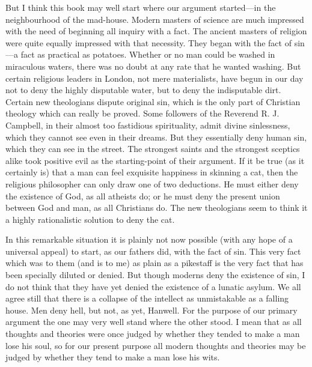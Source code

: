 \documentclass{book}
\begin{document}
But I think this book may well start where our argument started—in the neighbourhood of the mad-house. Modern masters of science are much impressed with the need of beginning all inquiry with a fact. The ancient masters of religion were quite equally impressed with that necessity. They began with the fact of sin—a fact as practical as potatoes. Whether or no man could be washed in miraculous waters, there was no doubt at any rate that he wanted washing. But certain religious leaders in London, not mere materialists, have begun in our day not to deny the highly disputable water, but to deny the indisputable dirt. Certain new theologians dispute original sin, which is the only part of Christian theology which can really be proved. Some followers of the Reverend R. J. Campbell, in their almost too fastidious spirituality, admit divine sinlessness, which they cannot see even in their dreams. But they essentially deny human sin, which they can see in the street. The strongest saints and the strongest sceptics alike took positive evil as the starting-point of their argument. If it be true (as it certainly is) that a man can feel exquisite happiness in skinning a cat, then the religious philosopher can only draw one of two deductions. He must either deny the existence of God, as all atheists do; or he must deny the present union between God and man, as all Christians do. The new theologians seem to think it a highly rationalistic solution to deny the cat.

In this remarkable situation it is plainly not now possible (with any hope of a universal appeal) to start, as our fathers did, with the fact of sin. This very fact which was to them (and is to me) as plain as a pikestaff is the very fact that has been specially diluted or denied. But though moderns deny the existence of sin, I do not think that they have yet denied the existence of a lunatic asylum. We all agree still that there is a collapse of the intellect as unmistakable as a falling house. Men deny hell, but not, as yet, Hanwell. For the purpose of our primary argument the one may very well stand where the other stood. I mean that as all thoughts and theories were once judged by whether they tended to make a man lose his soul, so for our present purpose all modern thoughts and theories may be judged by whether they tend to make a man lose his wits.
\end{document}
